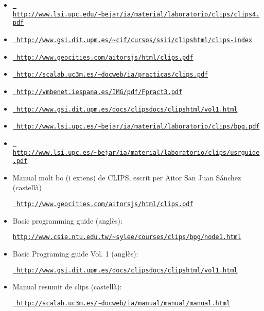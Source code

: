 \documentclass[11pt,svgnames]{scrbook}
\begin{document}
\begin{itemize}
\item
\href{
http://www.lsi.upc.edu/~bejar/ia/material/laboratorio/clips/clips4.pdf}{{
\tt
http://www.lsi.upc.edu/\~{}bejar/ia/material/laboratorio/clips/clips4.pdf}}
\item
\href{http://www.gsi.dit.upm.es/~cif/cursos/ssii/clipshtml/clips-index}{{
\tt
http://www.gsi.dit.upm.es/\~{}cif/cursos/ssii/clipshtml/clips-index}}
\item \href{http://www.geocities.com/aitorsjs/html/clips.pdf}{{\tt
http://www.geocities.com/aitorsjs/html/clips.pdf}}
\item \href{http://scalab.uc3m.es/~docweb/ia/practicas/clips.pdf}{{\tt
http://scalab.uc3m.es/\~{}docweb/ia/practicas/clips.pdf}}
\item \href{http://vmbenet.iespana.es/IMG/pdf/Fpract3.pdf}{{\tt
http://vmbenet.iespana.es/IMG/pdf/Fpract3.pdf}}
\item \href{http://www.gsi.dit.upm.es/docs/clipsdocs/clipshtml/vol1.html}{{\tt
http://www.gsi.dit.upm.es/docs/clipsdocs/clipshtml/vol1.html}}
\item
\href{http://www.lsi.upc.es/~bejar/ia/material/laboratorio/clips/bpg.pdf}
{{\tt
http://www.lsi.upc.es/\~{}bejar/ia/material/laboratorio/clips/bpg.pdf}}
\item
\href{
http://www.lsi.upc.es/~bejar/ia/material/laboratorio/clips/usrguide.pdf}{
{\tt
http://www.lsi.upc.es/\~{}bejar/ia/material/laboratorio/clips/usrguide.pdf}}
\item Manual molt bo (i extens) de CLIPS, escrit per Aitor San Juan Sánchez
(castellà)

\href{http://www.geocities.com/aitorsjs/html/clips.pdf}{{\tt
http://www.geocities.com/aitorsjs/html/clips.pdf}}

\item Basic programming guide (anglès):

\href{http://www.csie.ntu.edu.tw/~sylee/courses/clips/bpg/node1.html}{{
\tt http://www.csie.ntu.edu.tw/\~{}sylee/courses/clips/bpg/node1.html}}

\item Basic Programing guide Vol. 1 (anglès):

\href{http://www.gsi.dit.upm.es/docs/clipsdocs/clipshtml/vol1.html}{{\tt
http://www.gsi.dit.upm.es/docs/clipsdocs/clipshtml/vol1.html}}

\item Manual resumit de clips (castellà):

\href{http://scalab.uc3m.es/~docweb/ia/manual/manual/manual.html}{{\tt
http://scalab.uc3m.es/\~{}docweb/ia/manual/manual/manual.html}}


\end{itemize}
\end{document}
